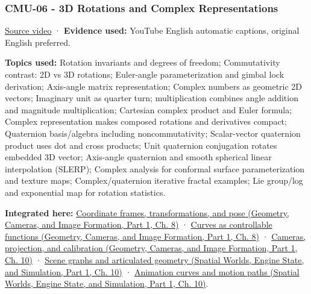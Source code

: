 \subsubsection{CMU-06 - 3D Rotations and Complex Representations}\label{04-visual-computing-ii-ch036-cmu-06---3d-rotations-and-complex-representations}

\hypertarget{04-visual-computing-ii-ch036-cmu-06---3d-rotations-and-complex-representations}{}

\href{https://www.youtube.com/watch?v=YF5ZUlKxSgE}{Source video} · \textbf{Evidence used:} YouTube English automatic captions, original English preferred.

\textbf{Topics used:} Rotation invariants and degrees of freedom; Commutativity contrast: 2D vs 3D rotations; Euler-angle parameterization and gimbal lock derivation; Axis-angle matrix representation; Complex numbers as geometric 2D vectors; Imaginary unit as quarter turn; multiplication combines angle addition and magnitude multiplication; Cartesian complex product and Euler formula; Complex representation makes composed rotations and derivatives compact; Quaternion basis/algebra including noncommutativity; Scalar-vector quaternion product uses dot and cross products; Unit quaternion conjugation rotates embedded 3D vector; Axis-angle quaternion and smooth spherical linear interpolation (SLERP); Complex analysis for conformal surface parameterization and texture maps; Complex/quaternion iterative fractal examples; Lie group/log and exponential map for rotation statistics.

\textbf{Integrated here:} \href{../03-Geometry-Cameras-and-Image-Formation-P01/main.pdf\#nameddest=03-visual-computing-i-ch001-coordinate-frames-transformations-and-pose}{Coordinate frames, transformations, and pose (Geometry, Cameras, and Image Formation, Part 1, Ch. 8)} · \href{../03-Geometry-Cameras-and-Image-Formation-P01/main.pdf\#nameddest=03-visual-computing-i-ch001-curves-as-controllable-functions}{Curves as controllable functions (Geometry, Cameras, and Image Formation, Part 1, Ch. 8)} · \href{../03-Geometry-Cameras-and-Image-Formation-P01/main.pdf\#nameddest=03-visual-computing-i-ch003-cameras-projection-and-calibration}{Cameras, projection, and calibration (Geometry, Cameras, and Image Formation, Part 1, Ch. 10)} · \href{../05-Spatial-Worlds-Engine-State-and-Simulation-P01/main.pdf\#nameddest=04-visual-computing-ii-ch029-scene-graphs-and-articulated-geometry}{Scene graphs and articulated geometry (Spatial Worlds, Engine State, and Simulation, Part 1, Ch. 10)} · \href{../05-Spatial-Worlds-Engine-State-and-Simulation-P01/main.pdf\#nameddest=04-visual-computing-ii-ch029-animation-curves-and-motion-paths}{Animation curves and motion paths (Spatial Worlds, Engine State, and Simulation, Part 1, Ch. 10)}.

